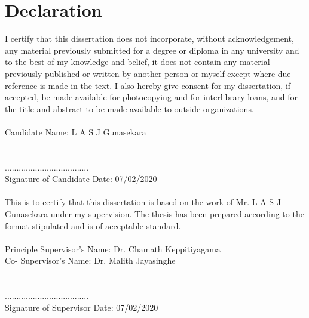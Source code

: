 \chapter*{Declaration}

I certify that this dissertation does not incorporate, without acknowledgement, any material previously submitted for a degree or diploma in any university and to the best of my knowledge and belief, it does not contain any material previously published or written by another person or myself except where due reference is made in the text. I also hereby give consent for my dissertation, if accepted, be made available for photocopying and for interlibrary loans, and for the title and abstract to be made available to outside organizations.
\\\\
Candidate Name: L A S J Gunasekara
\\\\\\
....................................\\
Signature of Candidate
\hspace*{.5\textwidth} Date: 07/02/2020
\\\\
This is to certify that this dissertation is based on the work of 
Mr. L A S J Gunasekara under my supervision. The thesis has been prepared according to the format stipulated and is of acceptable standard.
\\\\
Principle Supervisor’s Name: Dr. Chamath Keppitiyagama \\ 
Co- Supervisor’s Name: \hspace*{.055\textwidth} Dr.  Malith Jayasinghe
\\\\\\
....................................\\
Signature of Supervisor
\hspace*{.5\textwidth} Date: 07/02/2020